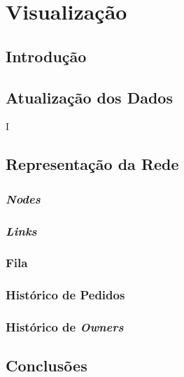 \chapter{Visualização}
\label{chap:visualizacao}

\section{Introdução}


\section{Atualização dos Dados}
I%

\section{Representação da Rede}
\subsection{\emph{Nodes}}
\subsection{\emph{Links}}
\subsection{Fila}
\subsection{Histórico de Pedidos}
\subsection{Histórico de \emph{Owners}}

\section{Conclusões}
